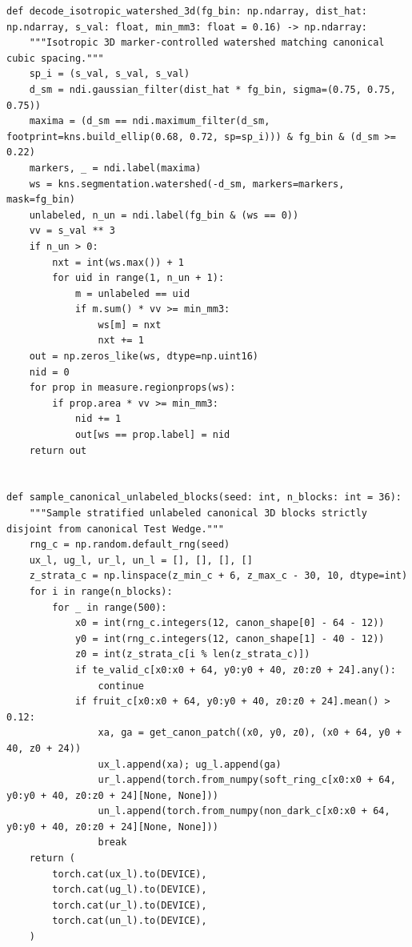 \documentclass[10pt,a4paper]{article}
\renewcommand{\_}{\origunderscore\allowbreak}
\begin{document}
\begin{codebox}
\begin{lstlisting}[style=pybmed]
def decode_isotropic_watershed_3d(fg_bin: np.ndarray, dist_hat: np.ndarray, s_val: float, min_mm3: float = 0.16) -> np.ndarray:
    """Isotropic 3D marker-controlled watershed matching canonical cubic spacing."""
    sp_i = (s_val, s_val, s_val)
    d_sm = ndi.gaussian_filter(dist_hat * fg_bin, sigma=(0.75, 0.75, 0.75))
    maxima = (d_sm == ndi.maximum_filter(d_sm, footprint=kns.build_ellip(0.68, 0.72, sp=sp_i))) & fg_bin & (d_sm >= 0.22)
    markers, _ = ndi.label(maxima)
    ws = kns.segmentation.watershed(-d_sm, markers=markers, mask=fg_bin)
    unlabeled, n_un = ndi.label(fg_bin & (ws == 0))
    vv = s_val ** 3
    if n_un > 0:
        nxt = int(ws.max()) + 1
        for uid in range(1, n_un + 1):
            m = unlabeled == uid
            if m.sum() * vv >= min_mm3:
                ws[m] = nxt
                nxt += 1
    out = np.zeros_like(ws, dtype=np.uint16)
    nid = 0
    for prop in measure.regionprops(ws):
        if prop.area * vv >= min_mm3:
            nid += 1
            out[ws == prop.label] = nid
    return out


def sample_canonical_unlabeled_blocks(seed: int, n_blocks: int = 36):
    """Sample stratified unlabeled canonical 3D blocks strictly disjoint from canonical Test Wedge."""
    rng_c = np.random.default_rng(seed)
    ux_l, ug_l, ur_l, un_l = [], [], [], []
    z_strata_c = np.linspace(z_min_c + 6, z_max_c - 30, 10, dtype=int)
    for i in range(n_blocks):
        for _ in range(500):
            x0 = int(rng_c.integers(12, canon_shape[0] - 64 - 12))
            y0 = int(rng_c.integers(12, canon_shape[1] - 40 - 12))
            z0 = int(z_strata_c[i % len(z_strata_c)])
            if te_valid_c[x0:x0 + 64, y0:y0 + 40, z0:z0 + 24].any():
                continue
            if fruit_c[x0:x0 + 64, y0:y0 + 40, z0:z0 + 24].mean() > 0.12:
                xa, ga = get_canon_patch((x0, y0, z0), (x0 + 64, y0 + 40, z0 + 24))
                ux_l.append(xa); ug_l.append(ga)
                ur_l.append(torch.from_numpy(soft_ring_c[x0:x0 + 64, y0:y0 + 40, z0:z0 + 24][None, None]))
                un_l.append(torch.from_numpy(non_dark_c[x0:x0 + 64, y0:y0 + 40, z0:z0 + 24][None, None]))
                break
    return (
        torch.cat(ux_l).to(DEVICE),
        torch.cat(ug_l).to(DEVICE),
        torch.cat(ur_l).to(DEVICE),
        torch.cat(un_l).to(DEVICE),
    )



\end{lstlisting}
\end{codebox}
\end{document}
